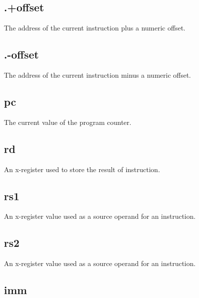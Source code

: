 \subsection{.+offset}

The address of the current instruction plus a numeric offset.

\subsection{.-offset}

The address of the current instruction minus a numeric offset.

\subsection{pc}

The current value of the program counter.

\subsection{rd}

An x-register used to store the result of instruction.

\subsection{rs1}

An x-register value used as a source operand for an instruction.

\subsection{rs2}

An x-register value used as a source operand for an instruction.

\subsection{imm}

